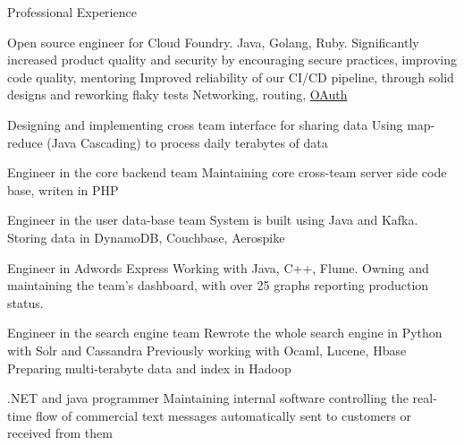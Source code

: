 \begin{rubric}{\color{ForestGreen} Professional Experience}

   Open source engineer
  for Cloud Foundry. Java, Golang, Ruby.
  Significantly increased product quality and security by encouraging
  secure practices, improving code quality, mentoring
  Improved reliability of our CI/CD pipeline, through solid designs
  and reworking flaky tests
  \entry* Networking, routing, \href{https://en.wikipedia.org/wiki/OAuth}{OAuth}

   Designing and implementing cross team interface for sharing data
  Using map-reduce (Java Cascading) to process daily terabytes of data

   Engineer in the core backend team
  Maintaining core cross-team server side code base, writen in PHP

   Engineer in the user data-base team
  System is built using Java and Kafka. Storing data in DynamoDB,
  Couchbase, Aerospike

  \entry*[\color{ForestGreen} {Feb 13 - Sep 14}]  Engineer in {Adwords Express}
  Working with Java, C++, Flume. Owning and maintaining the team's
  dashboard, with over 25 graphs reporting production status.


  Engineer in the {search engine team}
  Rewrote the whole search engine in Python with Solr and Cassandra
  Previously working with Ocaml, Lucene, Hbase
  Preparing multi-terabyte data and index in Hadoop


  .NET and java programmer
  Maintaining internal software controlling the real-time flow of
  commercial text messages automatically sent to customers or received
  from them

\end{rubric}
